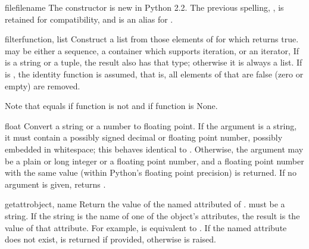 \begin{funcdesc}{file}{filename}
  The  constructor is new in Python 2.2.  The previous
  spelling, , is retained for compatibility, and is an
  alias for .
\end{funcdesc}

\begin{funcdesc}{filter}{function, list}
  Construct a list from those elements of  for which
   returns true.   may be either a sequence, a
  container which supports iteration, or an iterator,  If 
  is a string or a tuple, the result also has that type; otherwise it
  is always a list.  If  is , the identity
  function is assumed, that is, all elements of  that are false
  (zero or empty) are removed.

  Note that  equals
   if function is not
   and  if function is
  None.
\end{funcdesc}

\begin{funcdesc}{float}{}
  Convert a string or a number to floating point.  If the argument is a
  string, it must contain a possibly signed decimal or floating point
  number, possibly embedded in whitespace; this behaves identical to
  .  Otherwise, the argument may be a plain
  or long integer or a floating point number, and a floating point
  number with the same value (within Python's floating point
  precision) is returned.  If no argument is given, returns .

\end{funcdesc}

\begin{funcdesc}{getattr}{object, name}
  Return the value of the named attributed of .  
  must be a string.  If the string is the name of one of the object's
  attributes, the result is the value of that attribute.  For example,
   is equivalent to .  If the
  named attribute does not exist,  is returned if provided,
  otherwise  is raised.
\end{funcdesc}

